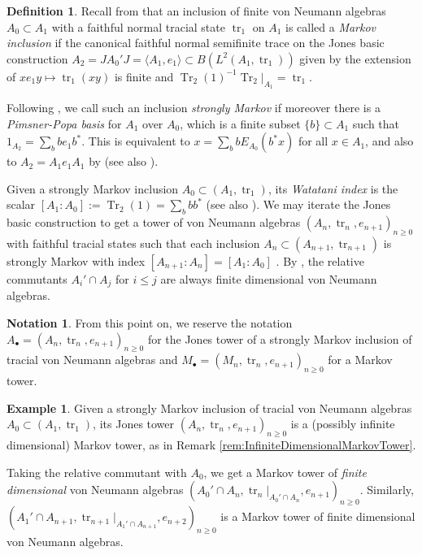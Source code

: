 \documentclass[11pt]{article}
\theoremstyle{plain}
\theoremstyle{definition}
\newtheorem{defn}[thm]{Definition}
\newtheorem{nota}[thm]{Notation}
\newtheorem{ex}[thm]{Example}
\DeclareMathOperator{\Tr}{Tr}
\DeclareMathOperator{\tr}{tr}
\begin{document}
\begin{defn}
\label{def:StronglyMarkovInclusion}
Recall from \cite{MR1278111} that an inclusion of finite von Neumann algebras $A_0\subset A_1$ with a faithful normal tracial state $\tr_1$ on $A_1$ is called a \emph{Markov inclusion} 
if
the canonical faithful normal semifinite trace on the Jones basic construction $A_2 = JA_0'J = \langle A_1, e_1\rangle \subset B(L^2(A_1, \tr_1))$ given by the extension of $xe_1y \mapsto \tr_1(xy)$ is finite and $\Tr_2(1)^{-1}\Tr_2|_{A_1}=\tr_1$.

Following \cite{MR2812459}, we call such an inclusion \emph{strongly Markov} if moreover there is a \emph{Pimsner-Popa basis} for $A_1$ over $A_0$, which is a finite subset $\{b\}\subset A_1$ such that $1_{A_2} = \sum_b b e_1b^*$.
This is equivalent to $x = \sum_b b E_{A_0}(b^*x)$ for all $x\in A_1$, and also to $A_2 = A_1e_1A_1$ by \cite[Prop.~3(b)]{MR561983}
(see also \cite{MR996807}).

Given a strongly Markov inclusion $A_0\subset (A_1, \tr_1)$, 
its \emph{Watatani index} \cite{MR996807} is the scalar $[A_1:A_0]:=\Tr_2(1) = \sum_b bb^* $ (see also \cite[1.1.4(c)]{MR1278111}).
We may iterate the Jones basic construction to get a tower of von Neumann algebras $(A_n ,\tr_n, e_{n+1})_{n\geq 0}$ with faithful tracial states such that each inclusion $A_{n}\subset (A_{n+1}, \tr_{n+1})$ is strongly Markov with index $[A_{n+1}: A_n] = [A_1:A_0]$ \cite{MR2812459}.
By \cite[Prop.~2.7.3]{MR996807}, the relative commutants $A_i' \cap A_j$ for $i\leq j$ are always finite dimensional von Neumann algebras.
\end{defn}

\begin{nota}
From this point on, we reserve the notation $A_\bullet=(A_n,\tr_n, e_{n+1})_{n\geq 0}$ for the Jones tower of a strongly Markov inclusion of tracial von Neumann algebras and $M_\bullet = (M_n, \tr_n, e_{n+1})_{n\geq 0}$ for a Markov tower.
\end{nota}

\begin{ex}
	Given a strongly Markov inclusion of tracial von Neumann algebras $A_0\subset (A_1, \tr_1)$, its Jones tower $(A_n, \tr_n, e_{n+1})_{n\geq 0}$ is a (possibly infinite dimensional) Markov tower, as in Remark \ref{rem:InfiniteDimensionalMarkovTower}.

Taking the relative commutant with $A_0$, we get a Markov tower of \emph{finite dimensional} von Neumann algebras $(A_0'\cap A_n , \tr_n|_{A_0'\cap A_n} , e_{n+1})_{n\geq 0}$.
Similarly, $(A_1'\cap A_{n+1} , \tr_{n+1}|_{A_1'\cap A_{n+1}} , e_{n+2})_{n\geq 0}$ is a Markov tower of finite dimensional von Neumann algebras.
\end{ex}
\end{document}
